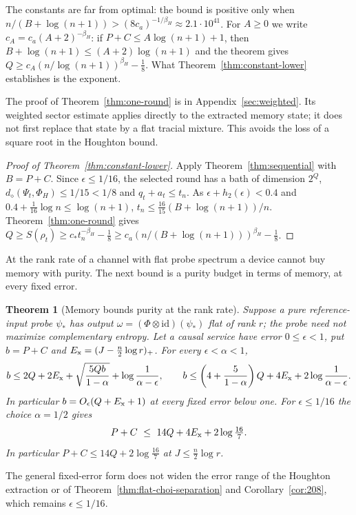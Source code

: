\documentclass[11pt,a4paper]{article}
\theoremstyle{plain}
\newtheorem{theorem}{Theorem}[section]
\theoremstyle{definition}
\theoremstyle{remark}
\newcommand{\ddia}{d_\diamond}
\begin{document}
The constants are far from optimal: the bound is positive only when $n/(B+\log(n+1))>(8c_a)^{-1/\beta_H}\approx2.1\cdot10^{41}$.
For $A\ge0$ we write $c_A=c_a(A+2)^{-\beta_H}$: if $P+C\le A\log(n+1)+1$, then $B+\log(n+1)\le(A+2)\log(n+1)$ and the theorem gives
$Q\ge c_A(n/\log(n+1))^{\beta_H}-\frac18$.
What Theorem~\ref{thm:constant-lower} establishes is the exponent.


The proof of Theorem~\ref{thm:one-round} is in
Appendix~\ref{sec:weighted}. Its weighted sector estimate applies directly to
the extracted memory state; it does not first replace that state by a flat
tracial mixture. This avoids the loss of a square root in the Houghton bound.


\begin{proof}[Proof of Theorem~\ref{thm:constant-lower}]
Apply Theorem~\ref{thm:sequential} with $B=P+C$. Since $\epsilon\le1/16$, the selected round has a bath of dimension $2^Q$,
$\ddia(\Psi_t,\Phi_H)\le1/15<1/8$ and $q_t+a_t\le t_n$. As $\epsilon+h_2(\epsilon)<0.4$ and $0.4+\frac1{16}\log n\le\log(n+1)$,
$t_n\le\frac{16}{15}(B+\log(n+1))/n$. Theorem~\ref{thm:one-round} gives
$Q\ge S(\rho_t)\ge c_*t_n^{-\beta_H}-\frac18\ge c_a(n/(B+\log(n+1)))^{\beta_H}-\frac18$.
\end{proof}


At the rank rate of a channel with flat probe spectrum a device cannot buy memory with purity. The next bound is a purity budget in terms of
memory, at every fixed error.

\begin{theorem}[Memory bounds purity at the rank rate]\label{thm:rank-purity}
Suppose a pure reference-input probe $\psi_*$ has output $\omega=(\Phi\otimes\mathrm{id})(\psi_*)$ flat of rank $r$; the probe need not
maximize complementary entropy. Let a causal service have error $0\le\epsilon<1$, put $b=P+C$ and $E_{\rm x}=(J-\frac n2\log r)_+$.
For every $\epsilon<\alpha<1$,
\[
b\le2Q+2E_{\rm x}+\sqrt{\frac{5Qb}{1-\alpha}}+\log\frac1{\alpha-\epsilon},\qquad
b\le\left(4+\frac5{1-\alpha}\right)Q+4E_{\rm x}+2\log\frac1{\alpha-\epsilon}.
\]
In particular $b=O_\epsilon(Q+E_{\rm x}+1)$ at every fixed error below one. For $\epsilon\le1/16$ the choice $\alpha=1/2$ gives
\[
P+C\ \le\ 14Q+4E_{\rm x}+2\log\tfrac{16}7 .
\]
In particular $P+C\le14Q+2\log\frac{16}7$ at $J\le\frac n2\log r$.
\end{theorem}

The general fixed-error form does not widen the error range of the Houghton extraction or of Theorem~\ref{thm:flat-choi-separation} and
Corollary~\ref{cor:208}, which remains $\epsilon\le1/16$.
\end{document}
